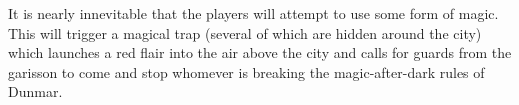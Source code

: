\documentclass[10pt,twoside,twocolumn]{article}
\begin{document}
It is nearly innevitable that the players will attempt to use some form of magic. This will trigger a magical trap (several of which are hidden around the city) which launches a red flair into the air above the city and calls for guards from the garisson to come and stop whomever is breaking the magic-after-dark rules of Dunmar.

\end{document}
